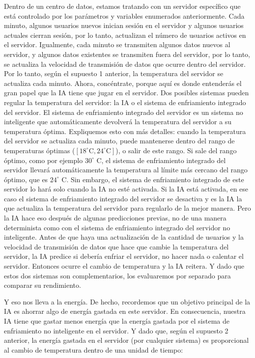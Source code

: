 \documentclass[
]{book}
\begin{document}
Dentro de un centro de datos, estamos tratando con un servidor específico que está controlado por los parámetros y variables enumerados anteriormente. Cada minuto, algunos usuarios nuevos inician sesión en el servidor y algunos usuarios actuales cierran sesión, por lo tanto, actualizan el número de usuarios activos en el servidor. Igualmente, cada minuto se transmiten algunos datos nuevos al servidor, y algunos datos existentes se transmiten fuera del servidor, por lo tanto, se actualiza la velocidad de transmisión de datos que ocurre dentro del servidor. Por lo tanto, según el supuesto 1 anterior, la temperatura del servidor se actualiza cada minuto. Ahora, concéntrate, porque aquí es donde entenderás el gran papel que la IA tiene que jugar en el servidor. Dos posibles sistemas pueden regular la temperatura del servidor: la IA o el sistema de enfriamiento integrado del servidor. El sistema de enfriamiento integrado del servidor es un sistema no inteligente que automáticamente devolverá la temperatura del servidor a su temperatura óptima. Expliquemos esto con más detalles: cuando la temperatura del servidor se actualiza cada minuto, puede mantenerse dentro del rango de temperaturas óptimas (\([18^{\circ} \textrm{C}, 24^{\circ} \textrm{C}]\)), o salir de este rango. Si sale del rango óptimo, como por ejemplo \(30^{\circ}\) C, el sistema de enfriamiento integrado del servidor llevará automáticamente la temperatura al límite más cercano del rango óptimo, que es \(24^{\circ}\) C. Sin embargo, el sistema de enfriamiento integrado de este servidor lo hará solo cuando la IA no esté activada. Si la IA está activada, en ese caso el sistema de enfriamiento integrado del servidor se desactiva y es la IA la que actualiza la temperatura del servidor para regularlo de la mejor manera. Pero la IA hace eso después de algunas predicciones previas, no de una manera determinista como con el sistema de enfriamiento integrado del servidor no inteligente. Antes de que haya una actualización de la cantidad de usuarios y la velocidad de transmisión de datos que hace que cambie la temperatura del servidor, la IA predice si debería enfriar el servidor, no hacer nada o calentar el servidor. Entonces ocurre el cambio de temperatura y la IA reitera. Y dado que estos dos sistemas son complementarios, los evaluaremos por separado para comparar su rendimiento.

Y eso nos lleva a la energía. De hecho, recordemos que un objetivo principal de la IA es ahorrar algo de energía gastada en este servidor. En consecuencia, nuestra IA tiene que gastar menos energía que la energía gastada por el sistema de enfriamiento no inteligente en el servidor. Y dado que, según el supuesto 2 anterior, la energía gastada en el servidor (por cualquier sistema) es proporcional al cambio de temperatura dentro de una unidad de tiempo:
\end{document}

